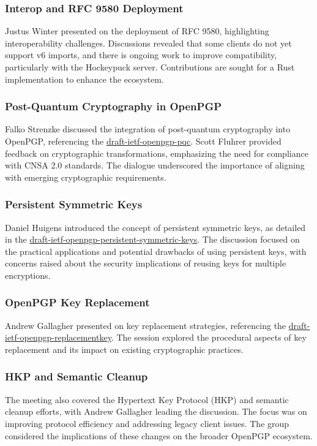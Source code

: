 \documentclass{article}
\begin{document}
\subsubsection{Interop and RFC 9580 Deployment}
Justus Winter presented on the deployment of RFC 9580, highlighting interoperability challenges. Discussions revealed that some clients do not yet support v6 imports, and there is ongoing work to improve compatibility, particularly with the Hockeypuck server. Contributions are sought for a Rust implementation to enhance the ecosystem.

\subsubsection{Post-Quantum Cryptography in OpenPGP}
Falko Strenzke discussed the integration of post-quantum cryptography into OpenPGP, referencing the \href{https://datatracker.ietf.org/doc/draft-ietf-openpgp-pqc/}{draft-ietf-openpgp-pqc}. Scott Fluhrer provided feedback on cryptographic transformations, emphasizing the need for compliance with CNSA 2.0 standards. The dialogue underscored the importance of aligning with emerging cryptographic requirements.

\subsubsection{Persistent Symmetric Keys}
Daniel Huigens introduced the concept of persistent symmetric keys, as detailed in the \href{https://datatracker.ietf.org/doc/draft-ietf-openpgp-persistent-symmetric-keys/}{draft-ietf-openpgp-persistent-symmetric-keys}. The discussion focused on the practical applications and potential drawbacks of using persistent keys, with concerns raised about the security implications of reusing keys for multiple encryptions.

\subsubsection{OpenPGP Key Replacement}
Andrew Gallagher presented on key replacement strategies, referencing the \href{https://datatracker.ietf.org/doc/draft-ietf-openpgp-replacementkey/}{draft-ietf-openpgp-replacementkey}. The session explored the procedural aspects of key replacement and its impact on existing cryptographic practices.

\subsubsection{HKP and Semantic Cleanup}
The meeting also covered the Hypertext Key Protocol (HKP) and semantic cleanup efforts, with Andrew Gallagher leading the discussion. The focus was on improving protocol efficiency and addressing legacy client issues. The group considered the implications of these changes on the broader OpenPGP ecosystem.
\end{document}

